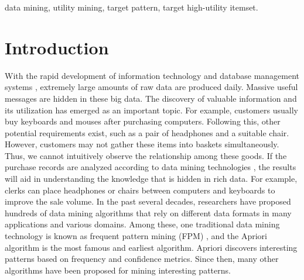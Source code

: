 \documentclass[journal]{IEEEtran}
\begin{document}
\begin{IEEEkeywords}
  data mining, utility mining, target pattern, target high-utility itemset.
\end{IEEEkeywords}


\IEEEpeerreviewmaketitle


\section{Introduction}
\label{sec:introduction}

With the rapid development of information technology and database management systems \cite{mccarthy1989architecture, stonebraker1991postgres}, extremely large amounts of raw data are produced daily. Massive useful messages are hidden in these big data. The discovery of valuable information and its utilization has emerged as an important topic. For example, customers usually buy keyboards and mouses after purchasing computers. Following this, other potential requirements exist, such as a pair of headphones and a suitable chair. However, customers may not gather these items into baskets simultaneously. Thus, we cannot intuitively observe the relationship among these goods. If the purchase records are analyzed according to data mining technologies \cite{aggarwal2014frequent}, the results will aid in understanding the knowledge that is hidden in rich data. For example, clerks can place headphones or chairs between computers and keyboards to improve the sale volume. In the past several decades, researchers have proposed hundreds of data mining algorithms that rely on different data formats in many applications and various domains. Among these, one traditional data mining technology is known as frequent pattern mining (FPM) \cite{agrawal1994fast, han2000mining}, and the Apriori \cite{agrawal1994fast} algorithm is the most famous and earliest algorithm. Apriori discovers interesting patterns based on frequency and confidence metrics. Since then, many other algorithms \cite{fournier2017survey, gan2017data} have been proposed for mining interesting patterns.
\end{document}
